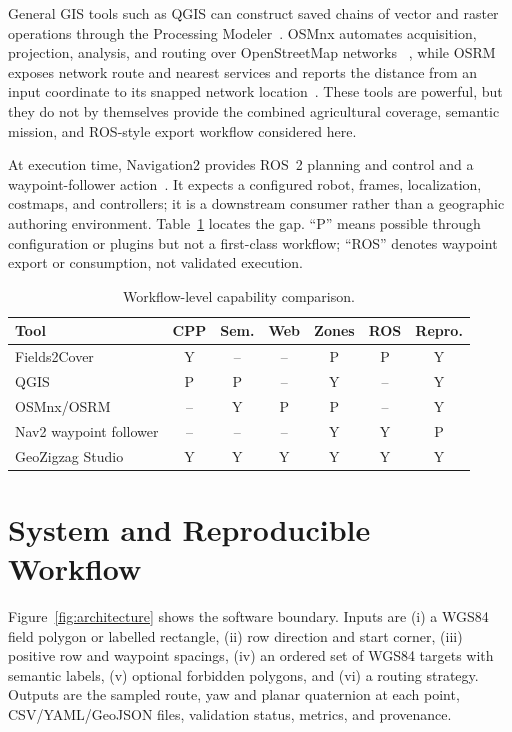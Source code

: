 \documentclass[conference,a4paper]{IEEEtran}
\begin{document}
General GIS tools such as QGIS can construct saved chains of vector and raster
operations through the Processing Modeler~\cite{qgisModeler}. OSMnx automates
acquisition, projection, analysis, and routing over OpenStreetMap networks
~\cite{boeing2017osmnx}, while OSRM exposes network route and nearest services
and reports the distance from an input coordinate to its snapped network
location~\cite{osrmApi}. These tools are powerful, but they do not by
themselves provide the combined agricultural coverage, semantic mission, and
ROS-style export workflow considered here.

At execution time, Navigation2 provides ROS~2 planning and control and a
waypoint-follower action~\cite{macenski2020marathon2,macenski2022ros2}. It
expects a configured robot, frames, localization, costmaps, and controllers;
it is a downstream consumer rather than a geographic authoring environment.
Table~\ref{tab:comparison} locates the gap. ``P'' means possible through
configuration or plugins but not a first-class workflow; ``ROS'' denotes
waypoint export or consumption, not validated execution.

\begin{table}[t]
\caption{Workflow-level capability comparison.}
\label{tab:comparison}
\centering
\scriptsize
\begin{tabular}{lcccccc}
\toprule
Tool & CPP & Sem. & Web & Zones & ROS & Repro.\\
\midrule
Fields2Cover & Y & -- & -- & P & P & Y\\
QGIS & P & P & -- & Y & -- & Y\\
OSMnx/OSRM & -- & Y & P & P & -- & Y\\
Nav2 waypoint follower & -- & -- & -- & Y & Y & P\\
GeoZigzag Studio & Y & Y & Y & Y & Y & Y\\
\bottomrule
\end{tabular}
\end{table}

\section{System and Reproducible Workflow}
Figure~\ref{fig:architecture} shows the software boundary. Inputs are (i) a
WGS84 field polygon or labelled rectangle, (ii) row direction and start
corner, (iii) positive row and waypoint spacings, (iv) an ordered set of WGS84
targets with semantic labels, (v) optional forbidden polygons, and (vi) a
routing strategy. Outputs are the sampled route, yaw and planar quaternion at
each point, CSV/YAML/GeoJSON files, validation status, metrics, and provenance.
\end{document}
